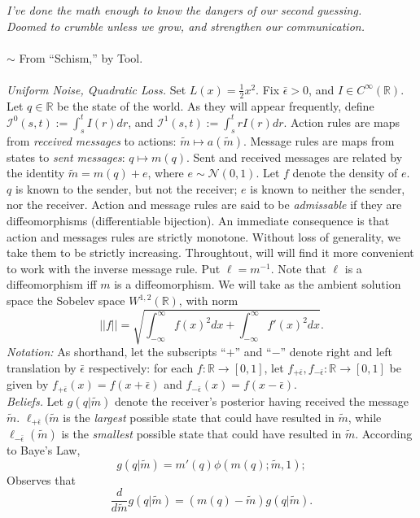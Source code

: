 \documentclass[12pt]{article}
\begin{document}
\begin{landscape}
\noindent\textit{I've done the math enough to know the dangers of our second guessing.\\ Doomed to crumble unless we grow, and strengthen our communication.}\\ \\$\sim$ From ``Schism,'' by Tool. \\ \\
\noindent\textit{Uniform Noise, Quadratic Loss.} Set $L(x)=\frac{1}{2}x^2$. Fix $\bar{\epsilon}>0$, and $I\in C^{\infty}(\mathbb{R})$. Let $q\in\mathbb{R}$ be the state of the world. As they will appear frequently, define $\mathcal{I}^{0}(s,t):=\int_{s}^{t}{I(r)dr}$, and $\mathcal{I}^{1}(s,t):=\int_{s}^{t}{rI(r)dr}$. Action rules are maps from \textit{received messages} to actions: $\tilde{m}\mapsto a(\tilde{m})$. Message rules are maps from states to \textit{sent messages}: $q\mapsto m(q)$. Sent and received messages are related by the identity $\tilde{m}=m(q)+e$, where $e\sim\mathcal{N}(0,1)$. Let $f$ denote the density of $e$. $q$ is known to the sender, but not the receiver; $e$ is known to neither the sender, nor the receiver. Action and message rules are said to be \textit{admissable} if they are diffeomorphisms (differentiable bijection). An immediate consequence is that action and messages rules are strictly monotone. Without loss of generality, we take them to be strictly increasing. Throughtout, will will find it more convenient to work with the inverse message rule. Put $\ell=m^{-1}$. Note that $\ell$ is a diffeomorphism iff $m$ is a diffeomorphism. We will take as the ambient solution space the Sobelev space $W^{1,2}(\mathbb{R})$, with norm
\begin{equation} 
||f||=\sqrt{\int_{-\infty}^{\infty}{f(x)^{2}dx}+\int_{-\infty}^{\infty}{f'(x)^{2}dx}}.
\end{equation}
\noindent\textit{Notation:} As shorthand, let the subscripts ``$+$'' and ``$-$'' denote right and left translation by $\bar{\epsilon}$ respectively: for each $f:\mathbb{R}\rightarrow[0,1]$, let $f_{+\bar{\epsilon}},f_{-\bar{\epsilon}}:\mathbb{R}\rightarrow[0,1]$ be given by $f_{+\bar{\epsilon}}(x)=f(x+\bar{\epsilon})$ and $f_{-\bar{\epsilon}}(x)=f(x-\bar{\epsilon})$. \\

\noindent\textit{Beliefs.} Let $g(q|\tilde{m})$ denote the receiver's posterior having received the message $\tilde{m}$. $\ell_{+\bar{\epsilon}}(\tilde{m}$ is the \textit{largest} possible state that could have resulted in $\tilde{m}$, while $\ell_{-\bar{\epsilon}}(\tilde{m})$ is the \textit{smallest} possible state that could have resulted in $\tilde{m}$. According to Baye's Law,
\begin{equation}
g(q|\tilde{m})=m'(q)\phi(m(q);\tilde{m},1);
\end{equation}
Observes that
\begin{equation}
\frac{d}{d\tilde{m}}g(q|\tilde{m})=(m(q)-\tilde{m})g(q|\tilde{m}).
\end{equation}


\end{landscape}
\end{document}
